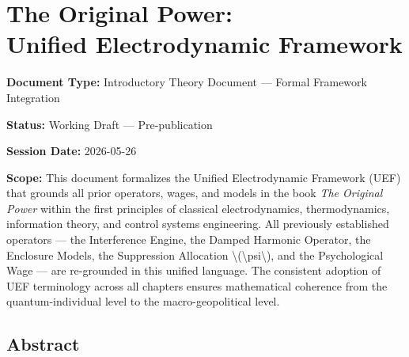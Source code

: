 \section{\texorpdfstring{The Original Power:\\
Unified Electrodynamic
Framework}{The Original Power: Unified Electrodynamic Framework}}\label{the-original-power-unified-electrodynamic-framework}

\textbf{Document Type:} Introductory Theory Document --- Formal
Framework Integration

\textbf{Status:} Working Draft --- Pre-publication

\textbf{Session Date:} 2026-05-26

\textbf{Scope:} This document formalizes the Unified Electrodynamic
Framework (UEF) that grounds all prior operators, wages, and models in
the book \emph{The Original Power} within the first
principles of classical electrodynamics, thermodynamics, information
theory, and control systems engineering. All previously established
operators --- the Interference Engine, the Damped Harmonic Operator, the
Enclosure Models, the Suppression Allocation
\textbackslash(\textbackslash psi\textbackslash), and the Psychological
Wage --- are re-grounded in this unified language. The consistent
adoption of UEF terminology across all chapters ensures mathematical
coherence from the quantum-individual level to the macro-geopolitical
level.

\subsection{Abstract}\label{abstract}

